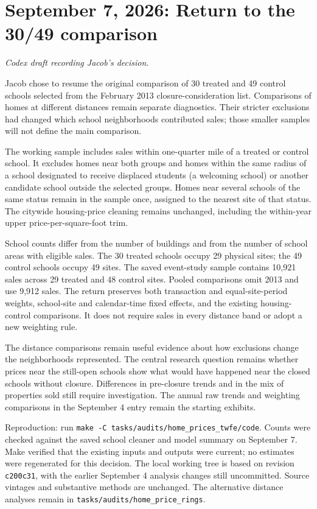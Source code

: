 \section*{September 7, 2026: Return to the 30/49 comparison}
\textit{Codex draft recording Jacob's decision.}

Jacob chose to resume the original comparison of 30 treated and 49 control
schools selected from the February 2013 closure-consideration list.
Comparisons of homes at different distances remain separate diagnostics.
Their stricter exclusions had changed which school neighborhoods contributed
sales; those smaller samples will not define the main comparison.

The working sample includes sales within one-quarter mile of a treated or
control school. It excludes homes near both groups and homes within the same
radius of a school designated to receive displaced students (a welcoming
school) or another candidate school outside the selected groups. Homes near several
schools of the same status remain in the sample once, assigned to the nearest
site of that status. The citywide housing-price cleaning remains unchanged,
including the within-year upper price-per-square-foot trim.

School counts differ from the number of buildings and from the number of
school areas with eligible sales.
The 30 treated schools occupy 29 physical sites; the 49 control schools occupy
49 sites. The saved event-study sample contains 10,921 sales across 29 treated
and 48 control sites. Pooled comparisons omit 2013 and use 9,912 sales. The
return preserves both transaction and equal-site-period weights, school-site
and calendar-time fixed effects, and the existing housing-control comparisons.
It does not require sales in every distance band or adopt a new weighting rule.

The distance comparisons remain useful evidence about how exclusions change
the neighborhoods represented. The central research question remains whether
prices near the still-open schools show what would have happened near the
closed schools without closure. Differences in pre-closure trends and in the
mix of properties sold still require investigation. The annual raw trends and
weighting comparisons in the September 4 entry remain the starting exhibits.

\smallskip
{\small Reproduction: run \texttt{make -C tasks/audits/home\_prices\_twfe/code}.
Counts were checked against the saved school cleaner and model summary on
September 7. Make verified that the existing inputs and outputs were current;
no estimates were regenerated for this decision. The local working tree is
based on revision \texttt{c200c31}, with the earlier September 4 analysis
changes still uncommitted. Source vintages and substantive methods are
unchanged. The alternative distance analyses remain in
\texttt{tasks/audits/home\_price\_rings}.}
